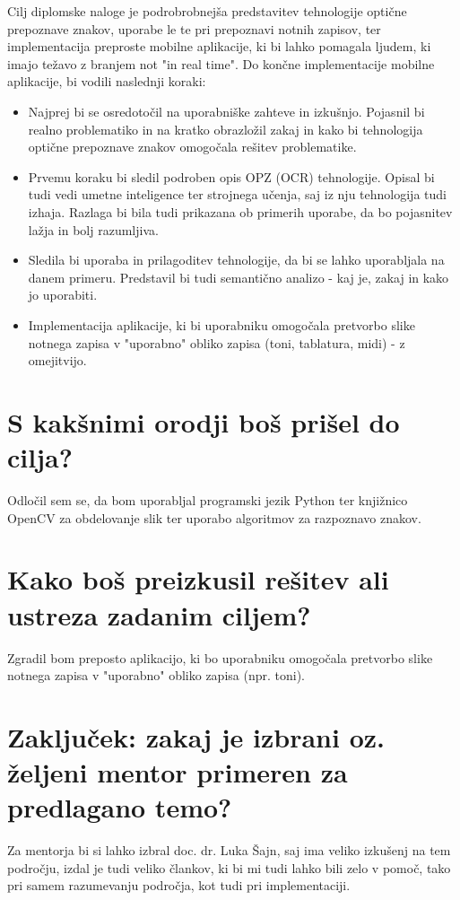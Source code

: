 \documentclass[11pt,a4paper]{article}
\begin{document}
Cilj diplomske naloge je podrobrobnejša predstavitev tehnologije optične prepoznave znakov, uporabe le te pri prepoznavi notnih zapisov, ter implementacija preproste mobilne aplikacije, ki bi lahko pomagala ljudem, ki imajo težavo z branjem not "in real time".
Do končne implementacije mobilne aplikacije, bi vodili naslednji koraki:
\begin{itemize}
\item
Najprej bi se osredotočil na uporabniške zahteve in izkušnjo. Pojasnil bi realno problematiko in na kratko obrazložil zakaj in kako bi tehnologija optične prepoznave znakov omogočala rešitev problematike.
\item
Prvemu koraku bi sledil podroben opis OPZ (OCR) tehnologije. Opisal bi tudi vedi umetne inteligence ter strojnega učenja, saj iz nju tehnologija tudi izhaja. Razlaga bi bila tudi prikazana ob primerih uporabe, da bo pojasnitev lažja in bolj razumljiva.
\item
Sledila bi uporaba in prilagoditev tehnologije, da bi se lahko uporabljala na danem primeru. Predstavil bi tudi semantično analizo - kaj je, zakaj in kako jo uporabiti.
\item
Implementacija aplikacije, ki bi uporabniku omogočala pretvorbo slike notnega zapisa v "uporabno" obliko zapisa (toni, tablatura, midi) - z omejitvijo.
\end{itemize}


\section{S kakšnimi orodji boš prišel do cilja?}

Odločil sem se, da bom uporabljal programski jezik Python ter knjižnico OpenCV za obdelovanje slik ter uporabo algoritmov za razpoznavo znakov.


\section{Kako boš preizkusil rešitev ali ustreza zadanim ciljem?}

Zgradil bom preposto aplikacijo, ki bo uporabniku omogočala pretvorbo slike notnega zapisa v "uporabno" obliko zapisa (npr. toni).


\section{Zaključek: zakaj je izbrani oz. željeni 
mentor primeren za predlagano temo?}

Za mentorja bi si lahko izbral doc. dr. Luka Šajn, saj ima veliko izkušenj na tem področju, izdal je tudi veliko člankov, ki bi mi tudi lahko bili zelo v pomoč, tako pri samem razumevanju področja, kot tudi pri implementaciji.



\end{document}
